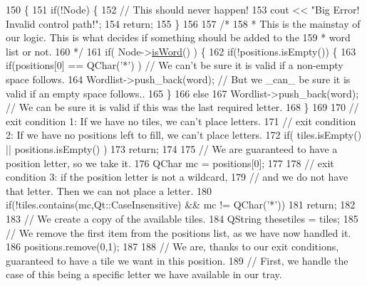 \begin{DoxyCode}
150                                                                                                            
               \{
151     \textcolor{keywordflow}{if}(!Node) \{
152         \textcolor{comment}{// This should never happen!}
153         cout << \textcolor{stringliteral}{"Big Error! Invalid control path!"};
154         \textcolor{keywordflow}{return};
155     \}
156 
157     \textcolor{comment}{/*}
158 \textcolor{comment}{     * This is the mainstay of our logic. This is what decides if something should be added to the}
159 \textcolor{comment}{     * word list or not.}
160 \textcolor{comment}{     */}
161     \textcolor{keywordflow}{if}( Node->\hyperlink{class_trie_node_a3fa48afcb9376feaf24c9d8acac7c076}{isWord}() ) \{
162         \textcolor{keywordflow}{if}(!positions.isEmpty()) \{
163             \textcolor{keywordflow}{if}(positions[0] == QChar(\textcolor{charliteral}{'*'}) ) \textcolor{comment}{// We can't be sure it is valid if a non-empty space follows.}
164                 Wordlist->push\_back(word);  \textcolor{comment}{// But we \_can\_ be sure it is valid if an empty space follows..}
165         \}
166         \textcolor{keywordflow}{else}
167             Wordlist->push\_back(word); \textcolor{comment}{// We can be sure it is valid if this was the last required letter.}
168     \}
169 
170     \textcolor{comment}{// exit condition 1: If we have no tiles, we can't place letters.}
171     \textcolor{comment}{// exit condition 2: If we have no positions left to fill, we can't place letters.}
172     \textcolor{keywordflow}{if}( tiles.isEmpty() || positions.isEmpty() )
173         \textcolor{keywordflow}{return};
174 
175     \textcolor{comment}{// We are guaranteed to have a position letter, so we take it.}
176     QChar mc = positions[0];
177 
178     \textcolor{comment}{// exit condition 3: if the position letter is not a wildcard,}
179     \textcolor{comment}{// and we do not have that letter. Then we can not place a letter.}
180     \textcolor{keywordflow}{if}(!tiles.contains(mc,Qt::CaseInsensitive) && mc != QChar(\textcolor{charliteral}{'*'}))
181         \textcolor{keywordflow}{return};
182 
183     \textcolor{comment}{// We create a copy of the available tiles.}
184     QString thesetiles = tiles;
185     \textcolor{comment}{// We remove the first item from the positions list, as we have now handled it.}
186     positions.remove(0,1);
187 
188     \textcolor{comment}{// We are, thanks to our exit conditions, guaranteed to have a tile we want in this position.}
189     \textcolor{comment}{// First, we handle the case of this being a specific letter we have available in our tray.}

\end{DoxyCode}
